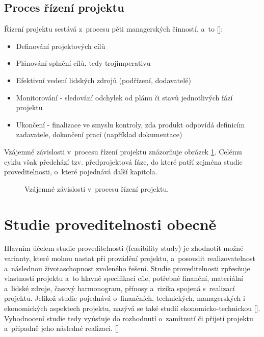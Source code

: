 \documentclass[
	11pt, oneside, printed, final, palatino, monochrome
	microtype,
	table,   %
	lof,     %
	lot     %
]{fithesis3}
\newcommand{\citepages}[2]{[\cite[#1]{#2}]}
\newcommand{\mezera}{\bigskip}
\begin{document}
{\subsection{Proces řízení projektu}
Řízení projektu sestává z~procesu pěti managerských činností, a~to \citepages{22-23}{rehacek_2013}:
\mezera
\begin{itemize}
\item Definování projektových cílů
\item Plánování splnění cílů, tedy trojimperativu
\item Efektivní vedení lidských zdrojů (podřízení, dodavatelé)
\item Monitorování - sledování odchylek od plánu či stavů jednotlivých fází projektu
\item Ukončení - finalizace ve smyslu kontroly, zda produkt odpovídá definicím zadavatele, dokončení prací (například dokumentace)
\end{itemize}

Vzájemné závislosti v~procesu řízení projektu znázorňuje obrázek \ref{fig:proces_rizeni_projektu}.
Celému cyklu však předchází tzv. předprojektová fáze, do které patří zejména studie proveditelnosti, o~které pojednává další kapitola.

\begin{figure}
    \centering
	\def\svgwidth{2.0\textwidth}
    
	\caption{Vzájemné závislosti v~procesu řízení projektu.}
	\label{fig:proces_rizeni_projektu}
\end{figure}

\section{Studie proveditelnosti obecně} \label{sec:studie_proveditelnosti}

Hlavním účelem studie proveditelnosti (feasibility study) je zhodnotit možné varianty, které mohou nastat při provádění projektu, a~posoudit realizovatelnost a~následnou životaschopnost zvoleného řešení. Studie proveditelnosti zpřesňuje vlastnosti projektu a~to hlavně specifikaci cíle, potřebné finanční, materiální a~lidské zdroje, časový harmonogram, přínosy a~rizika spojená s~realizací projektu. Jelikož studie pojednává o~finančních, technických, managerských i ekonomických aspektech projektu, nazývá se také studií ekonomicko-technickou \citepages{19}{fotr_1995}. Vyhodnocení studie tedy vyúsťuje do rozhodnutí o~zamítnutí či přijetí projektu a~případně jeho následné realizaci. \citepages{19-20}{fotr_1995} 

}
\end{document}
